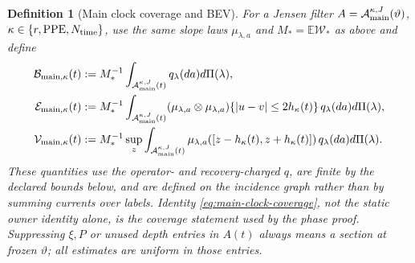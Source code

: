 \documentclass[11pt]{article}
\newtheorem{definition}[theorem]{Definition}
\begin{document}
\begin{definition}[Main clock coverage and BEV]
For a Jensen filter $A=\mathcal A_{\rm main}^{\kappa,J}(\vartheta)$,
$\kappa\in\{r,{\rm PPE},N_{\rm time}\}$, use the same slope laws
$\mu_{\lambda,a}$ and $M_*=\mathbb E\mathscr W_*$ as above and define
\begin{align}
 \mathcal B_{{\rm main},\kappa}(t)&:=M_*^{-1}
  \int_{\mathcal A_{\rm main}^{\kappa,J}(t)}q_\lambda(da)d\Pi(\lambda),
  \notag\\
 \mathcal E_{{\rm main},\kappa}(t)&:=M_*^{-1}
  \int_{\mathcal A_{\rm main}^{\kappa,J}(t)}
  (\mu_{\lambda,a}\otimes\mu_{\lambda,a})
  \{|u-v|\le2h_\kappa(t)\}\,q_\lambda(da)d\Pi(\lambda),
  \notag\\
 \mathcal V_{{\rm main},\kappa}(t)&:=M_*^{-1}\sup_z
  \int_{\mathcal A_{\rm main}^{\kappa,J}(t)}
  \mu_{\lambda,a}([z-h_\kappa(t),z+h_\kappa(t)])
  \,q_\lambda(da)d\Pi(\lambda).
 \label{eq:main-source-BEV}
\end{align}
These quantities use the operator- and recovery-charged $q$, are finite by
the declared bounds below, and are defined on the incidence graph rather
than by summing currents over labels.  Identity
\eqref{eq:main-clock-coverage}, not the static owner identity alone, is the
coverage statement used by the phase proof.  Suppressing $\xi,P$ or unused
depth entries in $A(t)$ always means a section at frozen $\vartheta$; all
estimates are uniform in those entries.
\end{definition}
\end{document}
